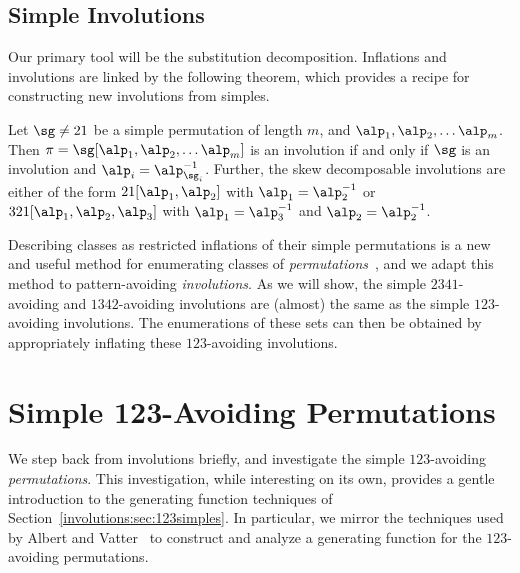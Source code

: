 \documentclass[12pt,twoside]{memoir}
\begin{document}
    \subsection{Simple Involutions}

      Our primary tool will be the substitution decomposition. Inflations and
      involutions are linked by the following theorem, which provides a recipe
      for constructing new involutions from simples. 

      \begin{theorem}
        \label{thm:subsdecomp-inv}
        Let $\sg \neq 21$ be a simple permutation of length $m$, and $\alp_1, 
        \alp_2, \dots \alp_m$. Then $\pi = \sg[\alp_1, \alp_2, \dots \alp_m]$ is
        an involution if and only if $\sg$ is an involution and $\alp_i =
        \alp_{\sg_i}^{-1}$. 
        Further, the skew decomposable involutions are either of the form
        $21[\alp_1, \alp_2]$ with $\alp_1 = \alp_2^{-1}$ or $321[\alp_1, \alp_2,
        \alp_3]$ with $\alp_1 = \alp_3^{-1}$ and $\alp_2 = \alp_2^{-1}$. 
      \end{theorem}

      Describing classes as restricted inflations of their simple permutations is
      a new and useful method for enumerating classes of
      \emph{permutations}~\cite{Albert2012}, and we adapt this method to pattern-avoiding
      \emph{involutions}. As we will show, the simple $2341$-avoiding and
      $1342$-avoiding involutions are (almost) the same as the simple
      $123$-avoiding involutions. The enumerations of these sets can then be
      obtained by appropriately inflating these $123$-avoiding involutions. 

      




  \section{Simple 123-Avoiding Permutations}
  \label{involutions:sec:perms}

    We step back from involutions briefly, and investigate the simple
    $123$-avoiding \emph{permutations}. This investigation, while interesting on
    its own, provides a gentle introduction to the generating function techniques
    of Section~\ref{involutions:sec:123simples}. In particular, we mirror the
    techniques used by Albert and Vatter~\cite{Vatter2013} to construct and
    analyze a generating function for the $123$-avoiding permutations. 
\end{document}
